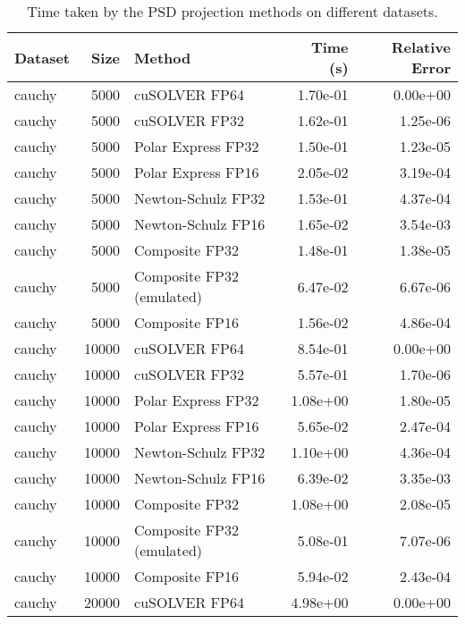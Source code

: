 \begin{table}
\centering
\caption{Time taken by the PSD projection methods on different datasets.}
\label{tab:benchmark_time}
\begin{tabular}{lrlrr}
\toprule
  Dataset &  Size &                    Method &  Time (s) &  Relative Error \\
\midrule
   cauchy &  5000 &             cuSOLVER FP64 &  1.70e-01 &        0.00e+00 \\
   cauchy &  5000 &             cuSOLVER FP32 &  1.62e-01 &        1.25e-06 \\
   cauchy &  5000 &        Polar Express FP32 &  1.50e-01 &        1.23e-05 \\
   cauchy &  5000 &        Polar Express FP16 &  2.05e-02 &        3.19e-04 \\
   cauchy &  5000 &        Newton-Schulz FP32 &  1.53e-01 &        4.37e-04 \\
   cauchy &  5000 &        Newton-Schulz FP16 &  1.65e-02 &        3.54e-03 \\
   cauchy &  5000 &            Composite FP32 &  1.48e-01 &        1.38e-05 \\
   cauchy &  5000 & Composite FP32 (emulated) &  6.47e-02 &        6.67e-06 \\
   cauchy &  5000 &            Composite FP16 &  1.56e-02 &        4.86e-04 \\
   cauchy & 10000 &             cuSOLVER FP64 &  8.54e-01 &        0.00e+00 \\
   cauchy & 10000 &             cuSOLVER FP32 &  5.57e-01 &        1.70e-06 \\
   cauchy & 10000 &        Polar Express FP32 &  1.08e+00 &        1.80e-05 \\
   cauchy & 10000 &        Polar Express FP16 &  5.65e-02 &        2.47e-04 \\
   cauchy & 10000 &        Newton-Schulz FP32 &  1.10e+00 &        4.36e-04 \\
   cauchy & 10000 &        Newton-Schulz FP16 &  6.39e-02 &        3.35e-03 \\
   cauchy & 10000 &            Composite FP32 &  1.08e+00 &        2.08e-05 \\
   cauchy & 10000 & Composite FP32 (emulated) &  5.08e-01 &        7.07e-06 \\
   cauchy & 10000 &            Composite FP16 &  5.94e-02 &        2.43e-04 \\
   cauchy & 20000 &             cuSOLVER FP64 &  4.98e+00 &        0.00e+00 \\

\end{tabular}
\end{table}
